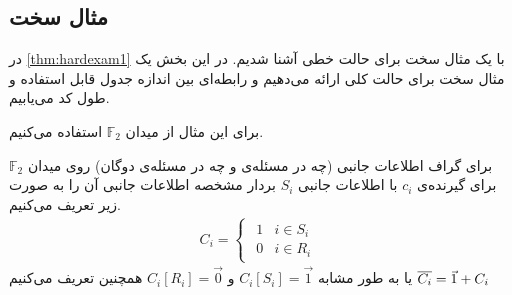 \subsection{
	مثال سخت
}
در 
\autoref{thm:hardexam1}
با یک مثال سخت برای حالت خطی آشنا شدیم. در این بخش یک مثال سخت برای حالت کلی ارائه می‌دهیم و رابطه‌ای بین اندازه جدول قابل استفاده و طول کد می‌یابیم.

برای این مثال از میدان 
$\mathbb{F}_2$
استفاده می‌کنیم.

\begin{definition}
	برای گراف اطلاعات جانبی (چه در مسئله‌ی
	\picod
	و چه در مسئله‌ی دوگان) روی میدان
	$\mathbb{F}_2$
	برای گیرنده‌ی 
	$c_i$
	با اطلاعات جانبی
	$S_i$
	بردار مشخصه اطلاعات جانبی آن را به صورت زیر تعریف می‌کنیم.
	\begin{align}
		C_i =
		\begin{cases}
			\begin{array}{ll}
			1 & i \in S_i \\
			0 &  i \in R_i
		\end{array}
		\end{cases}
	\end{align}
	یا به طور مشابه
	$C_i[S_i] = \vec{1}$
	و
	$ C_i[R_i] = \vec{0}$
	همچنین تعریف می‌کنیم
	$\overline{C_i} = \vec{1} + C_i$
\end{definition}

